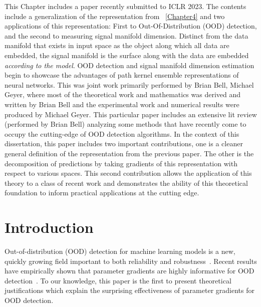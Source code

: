 This Chapter includes a paper recently submitted to ICLR 2023. The
contents include a generalization of the representation from
~\ref{Chapter4} and two applications of this representation: First to
Out-Of-Distribution (OOD) detection, and the second to measuring
signal manifold dimension. Distinct from the data manifold that exists in input space as the object along which all data are embedded, the signal manifold is the surface along with the data are embedded \emph{according to the model}. OOD detection and signal manifold dimension estimation begin to showcase the advantages of path kernel ensemble representations of neural
networks. This was joint work primarily performed by Brian Bell,
Michael Geyer, where most of the theoretical work and mathematics was
derived and written by Brian Bell and the experimental work and
numerical results were produced by Michael Geyer. This particular
paper includes an extensive lit review (performed by Brian Bell)
analyzing some methods that have recently come to occupy the
cutting-edge of OOD detection algorithms. In the context of this
dissertation, this paper includes two important contributions, one is
a cleaner general definition of the representation from the previous
paper. The other is the decomposition of predictions by taking
gradients of this representation with respect to various spaces. This
second contribution allows the application of this theory to a class
of recent work and demonstrates the ability of this theoretical
foundation to inform practical applications at the cutting edge. 




\section{Introduction}

Out-of-distribution (OOD) detection for machine learning models is a new, quickly growing field important to both reliability and robustness~\citep{hendrycks2019, biggio2014, hendrycks2017, desilva2023, yang2021, filos2020}.
Recent results have empirically shown that parameter gradients are highly informative for OOD detection~\citep{behpour2023, djurisic2023, huang2021}.
To our knowledge, this paper is the first to present theoretical justifications which explain the surprising effectiveness of parameter gradients for OOD detection.

